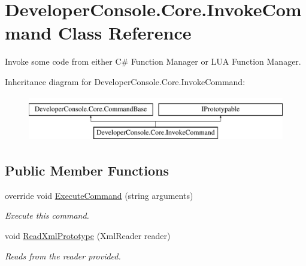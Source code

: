 \hypertarget{class_developer_console_1_1_core_1_1_invoke_command}{}\section{Developer\+Console.\+Core.\+Invoke\+Command Class Reference}
\label{class_developer_console_1_1_core_1_1_invoke_command}


Invoke some code from either C\# Function Manager or L\+UA Function Manager.  


Inheritance diagram for Developer\+Console.\+Core.\+Invoke\+Command\+:\begin{figure}[H]
\begin{center}
\leavevmode
\includegraphics[height=2.000000cm]{class_developer_console_1_1_core_1_1_invoke_command}
\end{center}
\end{figure}
\subsection*{Public Member Functions}
\begin{DoxyCompactItemize}
\item 
override void \hyperlink{class_developer_console_1_1_core_1_1_invoke_command_a3c7631154759c3304ae757cbc437d27d}{Execute\+Command} (string arguments)
\begin{DoxyCompactList}\small\item\em Execute this command. \end{DoxyCompactList}\item 
void \hyperlink{class_developer_console_1_1_core_1_1_invoke_command_a0d75a4414c49b069138f270a492754ee}{Read\+Xml\+Prototype} (Xml\+Reader reader)
\begin{DoxyCompactList}\small\item\em Reads from the reader provided. \end{DoxyCompactList}\end{DoxyCompactItemize}
